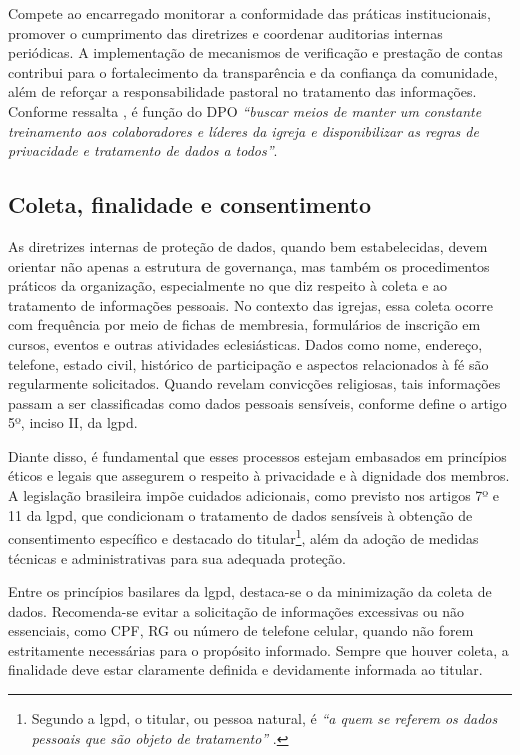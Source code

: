Compete ao encarregado monitorar a conformidade das práticas institucionais, promover o cumprimento das diretrizes e coordenar auditorias internas periódicas. A implementação de mecanismos de verificação e prestação de contas contribui para o fortalecimento da transparência e da confiança da comunidade, além de reforçar a responsabilidade pastoral no tratamento das informações. Conforme ressalta \cite[p. 19]{machado2020}, é função do DPO \textit{``buscar meios de manter um constante treinamento aos colaboradores e líderes da igreja e disponibilizar as regras de privacidade e tratamento de dados a todos''}.

\subsection{Coleta, finalidade e consentimento}

As diretrizes internas de proteção de dados, quando bem estabelecidas, devem orientar não apenas a estrutura de governança, mas também os procedimentos práticos da organização, especialmente no que diz respeito à coleta e ao tratamento de informações pessoais. No contexto das igrejas, essa coleta ocorre com frequência por meio de fichas de membresia, formulários de inscrição em cursos, eventos e outras atividades eclesiásticas. Dados como nome, endereço, telefone, estado civil, histórico de participação e aspectos relacionados à fé são regularmente solicitados. Quando revelam convicções religiosas, tais informações passam a ser classificadas como dados pessoais sensíveis, conforme define o artigo 5º, inciso II, da \gls{lgpd}.

Diante disso, é fundamental que esses processos estejam embasados em princípios éticos e legais que assegurem o respeito à privacidade e à dignidade dos membros. A legislação brasileira impõe cuidados adicionais, como previsto nos artigos 7º e 11 da \gls{lgpd}, que condicionam o tratamento de dados sensíveis à obtenção de consentimento específico e destacado do titular\footnote{Segundo a \gls{lgpd}, o titular, ou pessoa natural, é \textit{``a quem se referem os dados pessoais que são objeto de tratamento''} \cite[art. 5º, inciso V]{lgpd2018}.}, além da adoção de medidas técnicas e administrativas para sua adequada proteção.

Entre os princípios basilares da \gls{lgpd}, destaca-se o da minimização da coleta de dados. Recomenda-se evitar a solicitação de informações excessivas ou não essenciais, como CPF, RG ou número de telefone celular, quando não forem estritamente necessárias para o propósito informado. Sempre que houver coleta, a finalidade deve estar claramente definida e devidamente informada ao titular.

